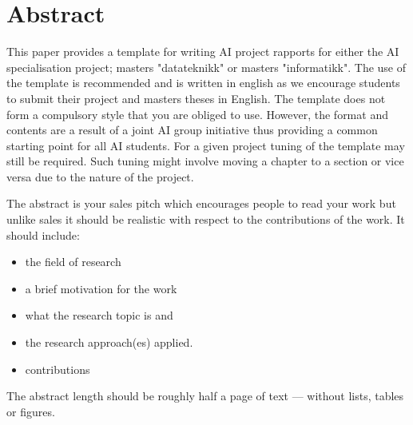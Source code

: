 \section*{Abstract}

This paper provides a template for writing AI project rapports for either the AI specialisation project; masters "datateknikk" or masters "informatikk". The use of the template is recommended and is written in english as we encourage students to submit their project and masters theses in English. 
The template does not form a compulsory style that you are obliged to use. However, the format and contents are a result of a joint AI group initiative thus providing a common starting point for all AI students. For a given project tuning of the template may still be required. Such tuning might involve moving a chapter to a section or vice versa due to the nature of the project. 

The abstract is your sales pitch which encourages people to read your work but unlike sales it should be realistic with respect to the contributions of the work. It should include:
\begin{itemize}
\item the field of research
\item a brief motivation for the work
\item what the research topic is and
\item the research approach(es) applied. 
\item contributions
\end{itemize}

The abstract length should be roughly half a page of text --- without lists, tables or figures.  